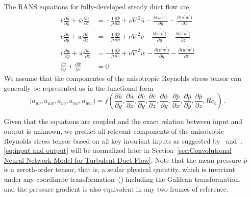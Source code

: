 \documentclass[11pt]{article}
\numberwithin{equation}{section}
\theoremstyle{plain}
\theoremstyle{definition}
\begin{document}
The RANS equations for fully-developed steady duct flow are,
\begin{align}
\overline{v}\frac{\partial \overline{u}}{\partial y}+\overline{w}\frac{\partial \overline{u}}{\partial z} &= -\frac{1}{\rho}\frac{d\overline{p}}{dx}+\nu\nabla^{2}\overline{u}-\frac{\partial\big( \overline{u^{\prime}v^{\prime}}\big)}{\partial y}-\frac{\partial\big( \overline{u^{\prime}w^{\prime}}\big)}{\partial z}  \label{eq:RANSduct1} \\
\overline{v}\frac{\partial \overline{v}}{\partial y}+\overline{w}\frac{\partial \overline{v}}{\partial z} &= -\frac{1}{\rho}\frac{d\overline{p}}{dy}+\nu\nabla^{2}\overline{v}-\frac{\partial\big( \overline{v^{\prime}v^{\prime}}\big)}{\partial y}-\frac{\partial\big( \overline{v^{\prime}w^{\prime}}\big)}{\partial z} \label{eq:RANSduct2} \\
\overline{v}\frac{\partial \overline{w}}{\partial y}+\overline{w}\frac{\partial \overline{w}}{\partial z} &= -\frac{1}{\rho}\frac{d\overline{p}}{dz}+\nu\nabla^{2}\overline{w}-\frac{\partial\big( \overline{v^{\prime}w^{\prime}}\big)}{\partial y}-\frac{\partial\big( \overline{w^{\prime}w^{\prime}}\big)}{\partial z} \label{eq:RANSduct3} \\
\frac{\partial \overline{v}}{\partial y}+\frac{\partial \overline{w}}{\partial z} &= 0 \label{eq:RANSduct4}
\end{align}
We assume that the componentes of the anisotropic Reynolds stress tensor can generally be represented as in the functional form
\begin{equation}
    \big(a_{uv},a_{uw},a_{vv},a_{vw},a_{ww}\big)=f\left(\frac{\partial \overline{u}}{\partial y},\frac{\partial \overline{u}}{\partial z},\frac{\partial \overline{v}}{\partial y},\frac{\partial \overline{v}}{\partial z},\frac{\partial \overline{w}}{\partial y},\frac{\partial\overline{p}}{\partial x},\frac{\partial\overline{p}}{\partial y},\frac{\partial\overline{p}}{\partial z},Re_{b}\right)\,.
    \label{eq:input and output}
\end{equation}

Given that the equations are coupled and the exact relation between input and output is unknown, we predict all relevant components of the anisotropic Reynolds stress tensor based on all key invariant inputs as suggested by~\cite{wu_again} and~\cite{laizet}. \eqref{eq:input and output} will be normalized later in Section~\ref{sec:Convolutional Neural Network Model for Turbulent Duct Flow}. Note that the mean pressure $\overline{p}$ is a zeroth-order tensor, that is, a scalar physical quantity, which is invariant under any coordinate transformation~(\cite{craft}) including the Galilean transformation, and the pressure gradient is also equivalent in any two frames of reference.
\end{document}
